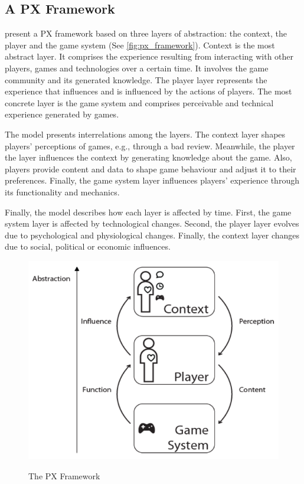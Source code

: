 \subsection{A PX Framework}
\textcite{Nackea2} present a \ac{PX} framework based on three layers of abstraction: the context, the player and the game system (See \autoref{fig:px_framework}). Context is the most abstract layer. It comprises the experience resulting from interacting with other players, games and technologies over a certain time. It involves the game community and its generated knowledge. The player layer represents the experience that influences and is influenced by the actions of players. The most concrete layer is the game system and comprises perceivable and technical experience generated by games.

The model presents interrelations among the layers. The context layer shapes players' perceptions of games, e.g., through a bad review. Meanwhile, the player the layer influences the context by generating knowledge about the game. Also, players provide content and data to shape game behaviour and adjust it to their preferences. Finally, the game system layer influences players' experience through its functionality and mechanics.

Finally, the model describes how each layer is affected by time. First, the game system layer is affected by technological changes. Second, the player layer evolves due to psychological and physiological changes. Finally, the context layer changes due to social, political or economic influences.

\begin{figure}[bth]
\myfloatalign
{\includegraphics[width=.6\linewidth]{gfx/model/px_framework}} \quad
\caption[The PX Framework]{The \ac{PX} Framework \autocite{Nackea2}}\label{fig:px_framework}
\end{figure}

